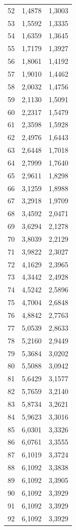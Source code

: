 \begin{small}
\begin{longtable}{rrr}
52 & 1,4878 & 1,3003 \\
53 & 1,5592 & 1,3335 \\
54 & 1,6359 & 1,3645 \\
55 & 1,7179 & 1,3927 \\
56 & 1,8061 & 1,4192 \\
57 & 1,9010 & 1,4462 \\
58 & 2,0032 & 1,4756 \\
59 & 2,1130 & 1,5091 \\
60 & 2,2317 & 1,5479 \\
61 & 2,3598 & 1,5928 \\
62 & 2,4976 & 1,6443 \\
63 & 2,6448 & 1,7018 \\
64 & 2,7999 & 1,7640 \\
65 & 2,9611 & 1,8298 \\
66 & 3,1259 & 1,8988 \\
67 & 3,2918 & 1,9709 \\
68 & 3,4592 & 2,0471 \\
69 & 3,6294 & 2,1278 \\
70 & 3,8039 & 2,2129 \\
71 & 3,9822 & 2,3027 \\
72 & 4,1629 & 2,3965 \\
73 & 4,3442 & 2,4928 \\
74 & 4,5242 & 2,5896 \\
75 & 4,7004 & 2,6848 \\
76 & 4,8842 & 2,7763 \\
77 & 5,0539 & 2,8633 \\
78 & 5,2160 & 2,9449 \\
79 & 5,3684 & 3,0202 \\
80 & 5,5088 & 3,0942 \\
81 & 5,6429 & 3,1577 \\
82 & 5,7659 & 3,2140 \\
83 & 5,8734 & 3,2621 \\
84 & 5,9623 & 3,3016 \\
85 & 6,0301 & 3,3326 \\
86 & 6,0761 & 3,3555 \\
87 & 6,1019 & 3,3724 \\
88 & 6,1092 & 3,3838 \\
89 & 6,1092 & 3,3905 \\
90 & 6,1092 & 3,3929 \\
91 & 6,1092 & 3,3929 \\
92 & 6,1092 & 3,3929 \\

\end{longtable}
\end{small}
